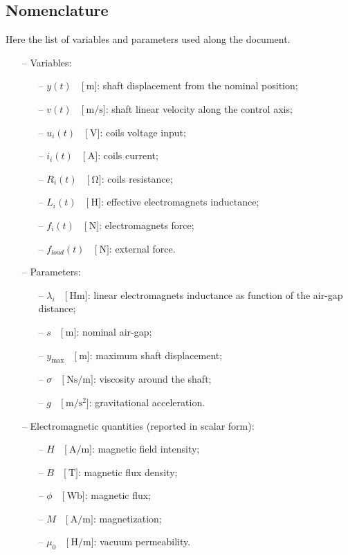 \documentclass[11pt,a4paper,oneside]{book}
\numberwithin{equation}{section}
\theoremstyle{it}
\theoremstyle{definition}
\begin{document}
\subsection{Nomenclature}	
Here the list of variables and parameters used along the document.
\begin{itemize}
	\item[--] Variables:
	\begin{itemize}
		\item[--] $y(t)\quad\Big[\SI{}{\meter}\Big]$: shaft displacement from the nominal position;
		\item[--] $v(t)\quad\Big[\SI{}{\meter\per\second}\Big]$: shaft linear velocity along the control axis;
		\item[--] $u_i(t)\quad\Big[\SI{}{\volt}\Big]$: coils voltage input;
		\item[--] $i_{i}(t)\quad\Big[\SI{}{\ampere}\Big]$: coils current;
		\item[--] $R_{i}(t)\quad\Big[\SI{}{\ohm}\Big]$: coils resistance;
		\item[--] $L_{i}(t)\quad\Big[\SI{}{\henry}\Big]$: effective electromagnets inductance;
		\item[--] $f_i(t)\quad\Big[\SI{}{\newton}\Big]$: electromagnets force;
		\item[--] $f_{load}(t)\quad\Big[\SI{}{\newton}\Big]$: external force.
	\end{itemize}
	\item[--] Parameters:
	\begin{itemize}
		\item[--] $\lambda_{i}\quad\Big[\SI{}{\henry\meter}\Big]$: linear electromagnets inductance as function of the air-gap distance;
		\item[--] $s\quad\Big[\SI{}{\meter}\Big]$: nominal air-gap;
		\item[--] $y_{\max}\quad\Big[\SI{}{\meter}\Big]$: maximum shaft displacement;
		\item[--] $\sigma\quad\Big[\SI{}{\newton\second\per\meter}\Big]$: viscosity around the shaft;
		\item[--] $g\quad\Big[\SI{}{\meter\per\square\second}\Big]$: gravitational acceleration.
	\end{itemize}
	\item[--] Electromagnetic quantities (reported in scalar form):
	\begin{itemize}
		\item[--] $H\quad\Big[\SI{}{\ampere\per\meter}\Big]$: magnetic field intensity;
		\item[--] $B\quad\Big[\SI{}{\tesla}\Big]$: magnetic flux density;
		\item[--] $\phi\quad\Big[\SI{}{\weber}\Big]$: magnetic flux;
		\item[--] $M\quad\Big[\SI{}{\ampere\per\meter}\Big]$: magnetization;
		\item[--] $\mu_0\quad\Big[\SI{}{\henry\per\meter}\Big]$: vacuum permeability.
	\end{itemize}
\end{itemize}
\end{document}

